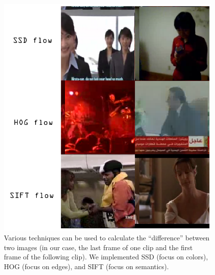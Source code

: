\begin{figure}
\centering
    \includegraphics[width=1.0\columnwidth]{figures/lowflowstitled.png}
\caption{Various techniques can be used to calculate the ``difference'' between two images (in our case, the last frame of one clip and the first frame of the following clip).  We implemented SSD (focus on colors), HOG (focus on edges), and SIFT (focus on semantics).}
\label{fig:flows}
\end{figure}

